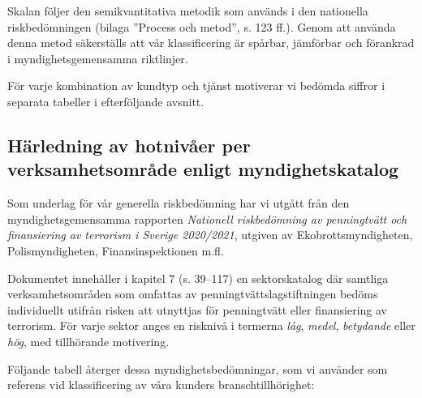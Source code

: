 \documentclass{article}
\begin{document}
\noindent Skalan följer den semikvantitativa metodik som används i den nationella riskbedömningen (bilaga ”Process och metod”, s. 123 ff.). Genom att använda denna metod säkerställs att vår klassificering är spårbar, jämförbar och förankrad i myndighetsgemensamma riktlinjer.

För varje kombination av kundtyp och tjänst motiverar vi bedömda siffror i separata tabeller i efterföljande avsnitt.

\vspace{3em}



\subsection*{Härledning av hotnivåer per verksamhetsområde enligt myndighetskatalog}


Som underlag för vår generella riskbedömning har vi utgått från den myndighetsgemensamma rapporten \textit{Nationell riskbedömning av penningtvätt och finansiering av terrorism i Sverige 2020/2021}, utgiven av Ekobrottsmyndigheten, Polismyndigheten, Finansinspektionen m.fl.

Dokumentet innehåller i kapitel 7 (s. 39–117) en sektorskatalog där samtliga verksamhetsområden som omfattas av penningtvättslagstiftningen bedöms individuellt utifrån risken att utnyttjas för penningtvätt eller finansiering av terrorism. För varje sektor anges en risknivå i termerna \textit{låg}, \textit{medel}, \textit{betydande} eller \textit{hög}, med tillhörande motivering.

Följande tabell återger dessa myndighetsbedömningar, som vi använder som referens vid klassificering av våra kunders branschtillhörighet:
\end{document}
